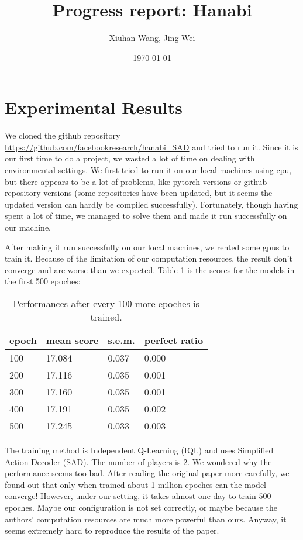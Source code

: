 \documentclass[12pt]{article}
\begin{document}
\title{\bf Progress report: Hanabi}
\author{Xiuhan Wang, Jing Wei}
\date{\today}
\maketitle

\section{Experimental Results}
We cloned the github repository \url{https://github.com/facebookresearch/hanabi_SAD} and tried to run it. Since it is our first time to do a project, we wasted a lot of time on dealing with environmental settings. We first tried to run it on our local machines using cpu, but there appears to be a lot of problems, like pytorch versions or github repository versions (some repositories have been updated, but it seems the updated version can hardly be compiled successfully). Fortunately, though having spent a lot of time, we managed to solve them and made it run successfully on our machine.

After making it run successfully on our local machines, we rented some gpus to train it. Because of the limitation of our computation resources, the result don't converge and are worse than we expected. Table \ref{Tab1} is the scores for the models in the first 500 epoches:
\begin{table}[H]
\begin{centering}
\begin{tabular}{|l|l|l|l|}
\hline
epoch & mean score & s.e.m. & perfect ratio \\ \hline
100 & 17.084 & 0.037 & 0.000 \\ \hline
200 & 17.116 & 0.035 & 0.001 \\ \hline  
300 & 17.160 & 0.035 & 0.001 \\ \hline
400 & 17.191 & 0.035 & 0.002 \\ \hline
500 & 17.245 & 0.033 & 0.003 \\ \hline
\end{tabular}
\caption{Performances after every 100 more epoches is trained.}
\label{Tab1}
\end{centering}
\end{table}

The training method is Independent Q-Learning (IQL) and uses Simplified Action Decoder (SAD). The number of players is $2$. We wondered why the performance seems too bad. After reading the original paper more carefully, we found out that only when trained about 1 million epoches can the model converge! However, under our setting, it takes almost one day to train $500$ epoches. Maybe our configuration is not set correctly, or maybe because the authors' computation resources are much more powerful than ours. Anyway, it seems extremely hard to reproduce the results of the paper.
\end{document}
